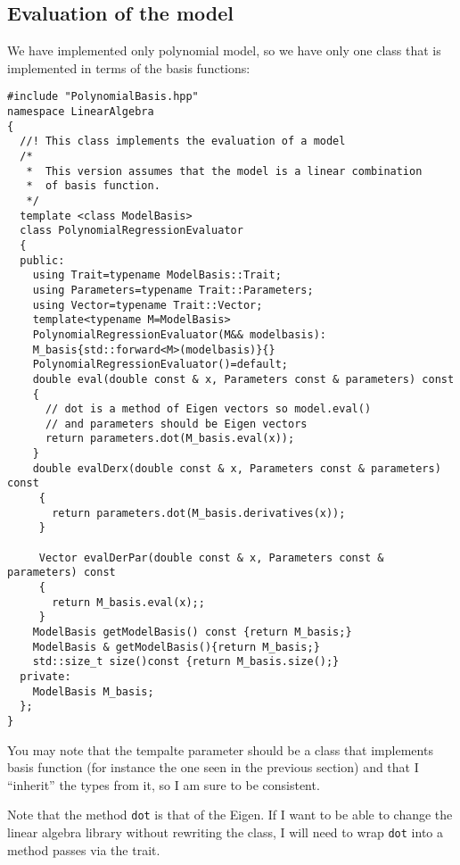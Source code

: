 \documentclass{article}
\newcommand{\li}{\lstinline}
\begin{document}
\subsection{Evaluation of the model}
We have implemented only polynomial model, so we have only one class
that is implemented in terms of the basis functions:
\begin{lstlisting}[title={PolynomialRegressionEvaluator.hpp}]
  #include "PolynomialBasis.hpp"
namespace LinearAlgebra
{
  //! This class implements the evaluation of a model
  /*
   *  This version assumes that the model is a linear combination
   *  of basis function.
   */
  template <class ModelBasis>
  class PolynomialRegressionEvaluator
  {
  public:
    using Trait=typename ModelBasis::Trait;
    using Parameters=typename Trait::Parameters;
    using Vector=typename Trait::Vector;
    template<typename M=ModelBasis>
    PolynomialRegressionEvaluator(M&& modelbasis):
    M_basis{std::forward<M>(modelbasis)}{}
    PolynomialRegressionEvaluator()=default;
    double eval(double const & x, Parameters const & parameters) const
    {
      // dot is a method of Eigen vectors so model.eval()
      // and parameters should be Eigen vectors
      return parameters.dot(M_basis.eval(x));
    }
    double evalDerx(double const & x, Parameters const & parameters) const
     {
       return parameters.dot(M_basis.derivatives(x));
     }

     Vector evalDerPar(double const & x, Parameters const & parameters) const
     {
       return M_basis.eval(x);;
     }
    ModelBasis getModelBasis() const {return M_basis;}
    ModelBasis & getModelBasis(){return M_basis;}
    std::size_t size()const {return M_basis.size();}
  private:
    ModelBasis M_basis;
  };
}
\end{lstlisting}
You may note that the tempalte parameter should be a class that
implements basis function (for instance the one seen in the previous
section) and that I ``inherit'' the types from it, so I am sure to be
consistent.

Note that the method \li!dot! is that of the Eigen. If I want to be able to change the linear algebra library without rewriting the class, I will need to wrap \li!dot! into a method passes via the trait.
\end{document}
